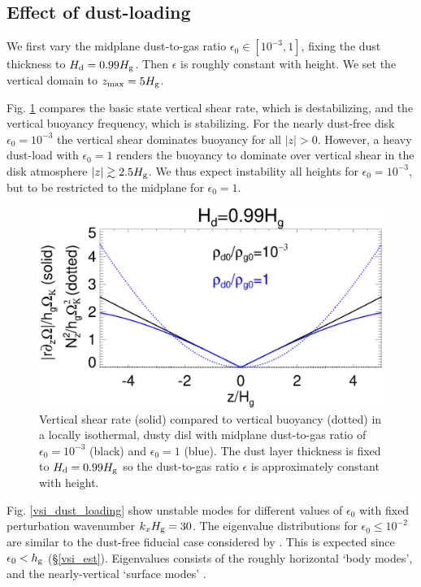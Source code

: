 
\subsection{Effect of dust-loading}
We first vary the midplane dust-to-gas ratio 
$\epsilon_0\in[10^{-3},1]$, fixing the dust thickness to  
$H_\mathrm{d}=0.99H_\mathrm{g}$. Then  $\epsilon$ is roughly constant with height. We
set the vertical domain to $z_\mathrm{max}=5H_\mathrm{g}$.  

Fig. \ref{compare_vshear_fixHd} compares the basic state
vertical shear rate, which is destabilizing, and the vertical buoyancy
frequency, which is stabilizing. For the nearly dust-free disk
$\epsilon_0=10^{-3}$ the vertical shear dominates buoyancy for all
$|z|>0$. However, a heavy dust-load with $\epsilon_0=1$ renders the 
buoyancy to dominate over vertical shear in the disk atmosphere 
$|z|\gtrsim 2.5H_\mathrm{g}$. We thus expect instability all heights for 
$\epsilon_0=10^{-3}$, but to be restricted to the midplane for
$\epsilon_0=1$. 

\begin{figure}
  \includegraphics[width=\linewidth]{figures/compare_vshear_Nz2_fixHd} 
  \caption{Vertical shear rate (solid) compared to vertical buoyancy
    (dotted) in a locally isothermal, dusty disl with midplane dust-to-gas ratio
    of $\epsilon_0=10^{-3}$ (black) and $\epsilon_0=1$ (blue). 
    The dust layer thickness is fixed to $H_\mathrm{d}=0.99H_\mathrm{g}$ so the 
    dust-to-gas ratio $\epsilon$ is approximately constant with
    height. 
    \label{compare_vshear_fixHd}
    }
\end{figure}

Fig. \ref{vsi_dust_loading} show unstable modes for different values
of $\epsilon_0$ with fixed perturbation wavenumber  $k_xH_\mathrm{g} = 30$. The
eigenvalue distributions for $\epsilon_0 \leq 10^{-2}$ are similar to the
dust-free fiducial case considered by . This is
expected since $\epsilon_0 < h_\mathrm{g}$ (\S\ref{vsi_est}). Eigenvalues 
consists 
of the roughly horizontal `body modes', and the nearly-vertical
`surface modes' \citep[which are associated with the imposed vertical
boundaries][]{barker15}.   

